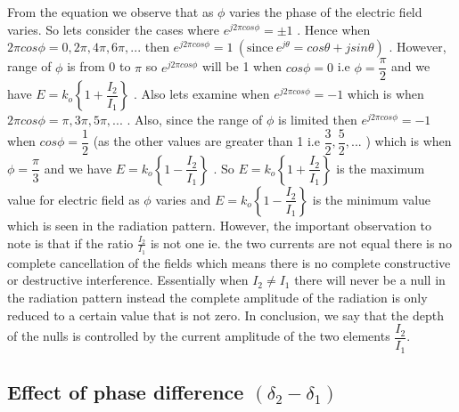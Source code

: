 From the equation we observe that as $ \phi $ varies  the phase of the electric field varies. So lets consider the cases where $ e^{j 2 \pi cos\phi} = \pm 1 $ . Hence when $ 2 \pi cos\phi = 0, 2 \pi, 4 \pi, 6 \pi, ... $ then  $ e^{j 2 \pi cos\phi} = 1\ (\text{since}\ e^{j \theta} = cos\theta + j sin\theta) $ . However, range of $ \phi $ is from 0 to $ \pi $ so $ e^{j 2 \pi cos\phi} $ will be 1 when $ cos\phi = 0 $ i.e $ \phi = \dfrac{ \pi }{ 2 } $ and we have $ E  = k_o \left\{ 1 + \dfrac{I_2}{I_1} \right\} $ .
Also lets examine when  $ e^{j 2 \pi cos\phi} = - 1 $ which is when $ 2 \pi cos\phi = \pi, 3 \pi, 5 \pi,... $ . Also, since the range of $ \phi $ is limited then $ e^{j 2 \pi cos\phi} = - 1 $ when $ cos\phi = \dfrac{ 1 }{ 2 } $ (as the other values are greater than 1 i.e $ \dfrac{ 3 }{ 2 }, \dfrac{ 5 }{ 2 }, ... $ ) which is when $ \phi = \dfrac{ \pi }{ 3 } $ and we have $ E  = k_o \left\{ 1 - \dfrac{I_2}{I_1} \right\} $ . So $ E  = k_o \left\{ 1 + \dfrac{I_2}{I_1} \right\} $ is the maximum value for electric field as  $ \phi $ varies and $ E  = k_o \left\{ 1 - \dfrac{I_2}{I_1} \right\} $ is the minimum value which is seen in the radiation pattern. However, the important observation to note is that if the ratio $\frac{I_2}{I_1}$ is not one ie. the two currents are not equal there is no complete cancellation of the fields which means there is no complete constructive or destructive interference. Essentially when $ I_2 \neq I_1 $ there will never be a null in the radiation pattern instead the complete amplitude of the radiation is only reduced to a certain value that is not zero. In conclusion, we say that the depth of the nulls is controlled by the current amplitude of the two elements $ \dfrac{ I_2 }{ I_1 } $.
\subsection{Effect of phase difference $ ( \delta_2 - \delta_1 ) $ }


